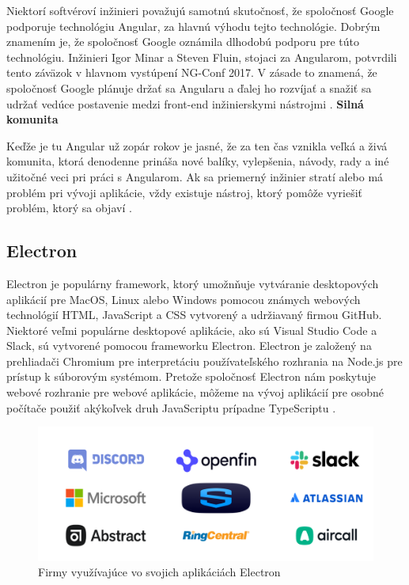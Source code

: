 \indent Niektorí softvéroví inžinieri považujú samotnú skutočnosť, že spoločnosť Google podporuje technológiu Angular, za hlavnú výhodu tejto technológie. Dobrým znamením je, že spoločnosť Google oznámila dlhodobú podporu pre túto technológiu. Inžinieri Igor Minar a Steven Fluin, stojaci za Angularom, potvrdili tento záväzok v hlavnom vystúpení NG-Conf 2017. V zásade to znamená, že spoločnosť Google plánuje držať sa Angularu a ďalej ho rozvíjať a snažiť sa udržať vedúce postavenie medzi front-end inžinierskymi nástrojmi \cite{angular_1}.\newline
\textbf{Silná komunita}

\indent Keďže je tu Angular už zopár rokov je jasné, že za ten čas vznikla veľká a živá komunita, ktorá denodenne prináša nové balíky, vylepšenia, návody, rady a iné užitočné veci pri práci s Angularom. Ak sa priemerný inžinier stratí alebo má problém pri vývoji aplikácie, vždy existuje nástroj, ktorý pomôže vyriešiť problém, ktorý sa objaví \cite{angular_1}.

\subsection{Electron}
\indent Electron je populárny framework, ktorý umožnňuje vytváranie desktopových aplikácií pre MacOS, Linux alebo Windows pomocou známych webových technológií HTML, JavaScript a CSS vytvorený a udržiavaný firmou GitHub. Niektoré veľmi populárne desktopové aplikácie, ako sú Visual Studio Code a Slack, sú vytvorené pomocou frameworku Electron. Electron je založený na prehliadači Chromium pre interpretáciu používateľského rozhrania na Node.js pre prístup k súborovým systémom. Pretože spoločnosť Electron nám poskytuje webové rozhranie pre webové aplikácie, môžeme na vývoj aplikácií pre osobné počítače použiť akýkoľvek druh JavaScriptu prípadne TypeScriptu \cite{electron}.

\begin{figure}[H]
    \centering
    \includegraphics[scale=0.35]{img/electron_aps.png}
    \caption{Firmy využívajúce vo svojich aplikáciách Electron \cite{electron}}
    \label{fig:electron_aps}
\end{figure}

